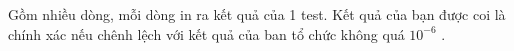 Gồm nhiều dòng, mỗi dòng in ra kết quả của 1 test. Kết quả của bạn được coi là chính xác nếu chênh lệch với kết quả của ban tổ chức không quá   \textbf{    $10^{-6}$}   .
